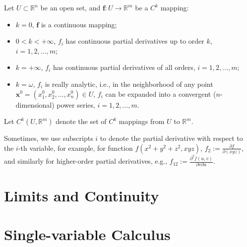 \documentclass[11pt]{../../TexTemplate/elegantbook}
\begin{document}
Let \(U \subset \mathbb{R}^n\) be an open set, and \(\mathbf{f}: U \to \mathbb{R}^m\) be a \(C^k\) mapping:  
\begin{itemize}
    \item \(k = 0\), \(\mathbf{f}\) is a continuous mapping;
    \item \(0 < k < +\infty\), \(f_i\) has continuous partial derivatives up to order \(k\), \(i = 1, 2, \dots, m\);
    \item \(k = +\infty\), \(f_i\) has continuous partial derivatives of all orders, \(i = 1, 2, \dots, m\);
    \item \(k = \omega\), \(f_i\) is really analytic, i.e., 
        in the neighborhood of any point \(\mathbf{x}^0 = (x_1^0, x_2^0, \dots, x_n^0) \in U\), 
        \(f_i\) can be expanded into a convergent (\(n\)-dimensional) power series, \(i = 1, 2, \dots, m\).
\end{itemize}
Let \(C^k(U, \mathbb{R}^m)\) denote the set of \(C^k\) mappings from \(U\) to \(\mathbb{R}^m\).

Sometimes, we use subscripts \(i\) to denote the partial derivative with respect to the \(i\)-th variable,
for example, for function \(f(x^{2}+y^{2}+z^{2},xyz)\), \(f_{2}:=\frac{\partial f}{\partial (xyz)}\),
and similarly for higher-order partial derivatives, e.g., \(f_{12} := \frac{\partial^2 f(u, v)}{\partial v \partial u}\).

\mainmatter         %

\part{Limits and Continuity}
\part{Single-variable Calculus}
\end{document}
